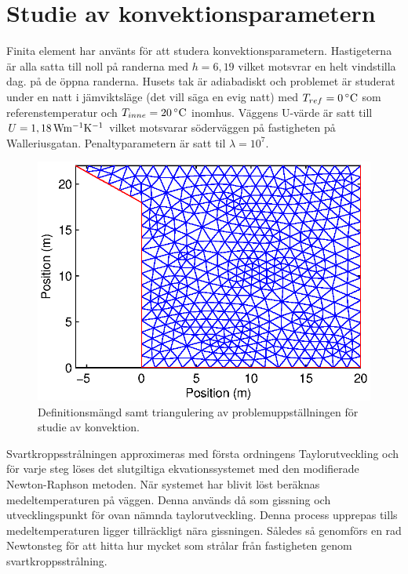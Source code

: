 \section{Studie av konvektionsparametern}

Finita element har använts för att studera konvektionsparametern. Hastigeterna är alla
satta till noll på randerna med $h=6,19$ vilket motsvrar en helt vindstilla dag.
på de öppna randerna. Husets tak är adiabadiskt
och problemet är studerat under en natt i jämviktsläge (det vill säga en evig natt) med
$T_{ref} = \unit[0]{^\circ C}$ som referenstemperatur och $T_{inne} = \unit[20]{^\circ C}$ inomhus.
Väggens U-värde är satt till $U = \unit[1,18]{Wm^{-1}K^{-1}}$ vilket motsvarar söderväggen på fastigheten på Walleriusgatan. Penaltyparametern är satt til $\lambda = 10^7$.

\begin{figure}
\centering
\includegraphics{images/triconvec.eps}
\caption{Definitionsmängd samt triangulering av problemuppställningen för studie av konvektion.}
\end{figure}

Svartkroppsstrålningen approximeras med första ordningens Taylorutveckling och
för varje steg löses det slutgiltiga ekvationssystemet med den
modifierade Newton-Raphson metoden. När systemet har blivit löst beräknas
medeltemperaturen på väggen. Denna används då som gissning och utvecklingspunkt
för ovan nämnda taylorutveckling. Denna process upprepas tills medeltemperaturen
ligger tillräckligt nära gissningen. Således så genomförs en rad Newtonsteg
för att hitta hur mycket som strålar från fastigheten genom svartkroppsstrålning.

